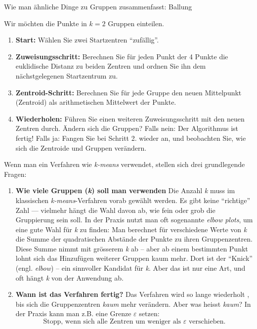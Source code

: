 \begin{lpu}{Wie man ähnliche Dinge zu Gruppen zusammenfasst: Ballung}
\begin{aufgabe}{4}
Wir möchten die Punkte in $k = 2$ Gruppen einteilen.

\begin{enumerate}
  \item \textbf{Start:} Wählen Sie zwei Startzentren ``zufällig''.

  \item \textbf{Zuweisungsschritt:} Berechnen Sie für jeden Punkt der 4 Punkte die euklidische Distanz zu beiden Zentren und ordnen Sie ihn dem nächstgelegenen Startzentrum zu.

  \item \textbf{Zentroid-Schritt:} Berechnen Sie für jede Gruppe den neuen Mittelpunkt (Zentroid) als arithmetischen Mittelwert der Punkte.

  \item \textbf{Wiederholen:} Führen Sie einen weiteren Zuweisungsschritt mit den neuen Zentren durch. Ändern sich die Gruppen? Falls nein: Der Algorithmus ist fertig! Falls ja: Fangen Sie bei Schritt 2. wieder an, und beobachten Sie, wie sich die Zentroide und Gruppen verändern.

\end{enumerate}
\end{aufgabe}


Wenn man ein Verfahren wie \textit{k-means} verwendet, stellen sich drei grundlegende Fragen:

\begin{enumerate}
    \item \textbf{Wie viele Gruppen (\textit{k}) soll man verwenden}
    Die Anzahl \textit{k} muss im klassischen \textit{k-means}-Verfahren vorab gewählt werden. Es gibt keine ``richtige'' Zahl — vielmehr hängt die Wahl davon ab, wie fein oder grob die Gruppierung sein soll.  In der Praxis nutzt man oft sogenannte \textit{elbow plots}, um eine gute Wahl für \textit{k} zu finden: Man berechnet für verschiedene Werte von \textit{k} die Summe der quadratischen Abstände der Punkte zu ihren Gruppenzentren. Diese Summe nimmt mit grösserem \textit{k} ab – aber ab einem bestimmten Punkt lohnt sich das Hinzufügen weiterer Gruppen kaum mehr. Dort ist der ``Knick'' (engl. \textit{elbow}) – ein sinnvoller Kandidat für \textit{k}. Aber das ist nur eine Art, und oft hängt \textit{k} von der Anwendung ab.
    
    \item \textbf{Wann ist das Verfahren fertig?} 
Das Verfahren wird so lange wiederholt , bis sich die Gruppenzentren \textit{kaum} mehr verändern. Aber was heisst \textit{kaum}? In der Praxis kann man z.B. eine Grenze $\varepsilon$ setzen:  
\[
\text{Stopp, wenn sich alle Zentren um weniger als } \varepsilon \text{ verschieben.}
\]


\end{enumerate}
\end{lpu}
